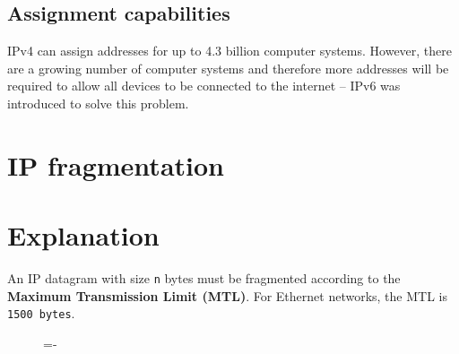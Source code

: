 \documentclass[a4paper]{systems-software}
\begin{document}
\subsection*{Assignment capabilities}

IPv4 can assign addresses for up to 4.3 billion computer systems. However, there are a growing number of computer systems and therefore more addresses will be required to allow all devices to be connected to the internet – IPv6 was introduced to solve this problem.


\newpage

\section{IP fragmentation}

\section*{Explanation}

An IP datagram with size \texttt{n} bytes must be fragmented according to the \textbf{Maximum Transmission Limit (MTL)}. For Ethernet networks, the MTL is \texttt{1500 bytes}.

\begin{figure}[H]
	\lineskip=-\fboxrule
\end{figure}
\end{document}
